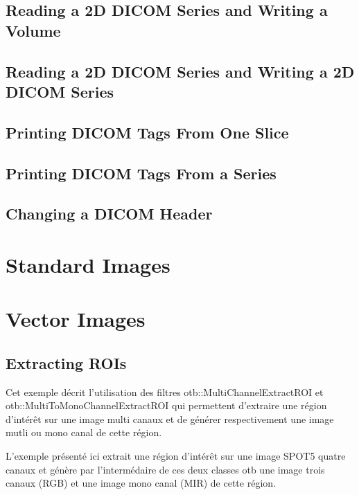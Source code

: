\subsection{Reading a 2D DICOM Series and Writing a Volume}
\label{DicomSeriesReadImageWrite2}
%

\subsection{Reading a 2D DICOM Series and Writing a 2D DICOM Series}
\label{DicomSeriesReadSeriesWrite}
%

\subsection{Printing DICOM Tags From One Slice}
\label{DicomImageReadPrintTags}
%

\subsection{Printing DICOM Tags From a Series}
\label{DicomSeriesReadPrintTags}
%

\subsection{Changing a DICOM Header}
\label{DicomImageReadChangeHeaderWrite}
%





\section{Standard Images}
\section{Vector Images}
\subsection{Extracting ROIs}
\label{sec:ExtractROI}

Cet exemple d\'ecrit l'utilisation des filtres otb::MultiChannelExtractROI et
otb::MultiToMonoChannelExtractROI qui permettent d'extraire une r\'egion d'int\'er\^et
sur une image multi canaux et de g\'en\'erer respectivement une image mutli ou 
mono canal de cette r\'egion.

L'exemple pr\'esent\'e ici extrait une r\'egion d'int\'er\^et sur une image SPOT5 
quatre canaux et g\'en\`ere par l'interm\'edaire de ces deux classes otb une image trois 
canaux (RGB) et une image mono canal (MIR) de cette r\'egion. 


\ifitkFullVersion

\fi
